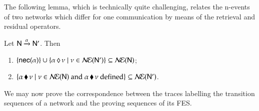  The following lemma, which is technically quite challenging, %
  relates the n-events of two networks which differ for one communication by means of the retrieval and residual operators. 

\begin{lemma}\label{epp}
Let ${\sf N}\xrightarrow{\alpha}{\sf N}'$. Then 
\begin{enumerate}
\item\label{epp1} $\{{\sf nec}(\alpha)\}\cup\{{\alpha}\,\lozenge\,{\nu}\mid\nu\in\mathcal{N\!E}({\sf N}')\}\subseteq\mathcal{N\!E}({\sf N})$; 
\item\label{epp2}  $\{{\alpha}\,\blacklozenge\,{\nu}\mid\nu\in\mathcal{N\!E}({\sf N})\text{ and }{\alpha}\,\blacklozenge\,{\nu}\text{ defined} \}\subseteq\mathcal{N\!E}({\sf N}')$. 
\end{enumerate}
\end{lemma}


 We may now prove the correspondence between the traces labelling
the transition sequences of a network and the proving sequences of its
FES.  

